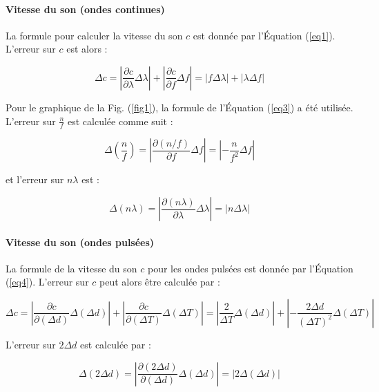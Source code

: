 \documentclass[a4paper, 12pt,oneside]{article}
\begin{document}
\paragraph{Vitesse du son (ondes continues)}

La formule pour calculer la vitesse du son \( c \) est donnée par l'Équation (\ref{eq1}). L'erreur sur \( c \) est alors :

\begin{equation}
\Delta c = \left| \frac{\partial c}{\partial \lambda} \Delta \lambda \right| + \left| \frac{\partial c}{\partial f} \Delta f \right| = |f \Delta \lambda| + |\lambda \Delta f|
\end{equation}

Pour le graphique de la Fig. (\ref{fig1}), la formule de l'Équation (\ref{eq3}) a été utilisée. L'erreur sur \( \frac{n}{f} \) est calculée comme suit :

\begin{equation}
\Delta \left( \frac{n}{f} \right) = \left| \frac{\partial (n/f)}{\partial f} \Delta f \right| = \left| -\frac{n}{f^2} \Delta f \right|
\end{equation}

et l'erreur sur \( n \lambda \) est :

\begin{equation}
\Delta (n \lambda) = \left| \frac{\partial (n \lambda)}{\partial \lambda} \Delta \lambda \right| = |n \Delta \lambda|
\end{equation}

\paragraph{Vitesse du son (ondes pulsées)}

La formule de la vitesse du son \( c \) pour les ondes pulsées est donnée par l'Équation (\ref{eq4}). L'erreur sur \( c \) peut alors être calculée par :

\begin{equation}
\Delta c = \left| \frac{\partial c}{\partial (\Delta d)} \Delta (\Delta d) \right| + \left| \frac{\partial c}{\partial (\Delta T)} \Delta (\Delta T) \right| = \left| \frac{2}{\Delta T} \Delta (\Delta d) \right| + \left| -\frac{2 \Delta d}{(\Delta T)^2} \Delta (\Delta T) \right|
\end{equation}

L'erreur sur \( 2 \Delta d \) est calculée par :

\begin{equation}
\Delta (2\Delta d) = \left| \frac{\partial (2\Delta d)}{\partial (\Delta d)} \Delta (\Delta d) \right| = |2 \Delta (\Delta d)|
\end{equation}
\end{document}
